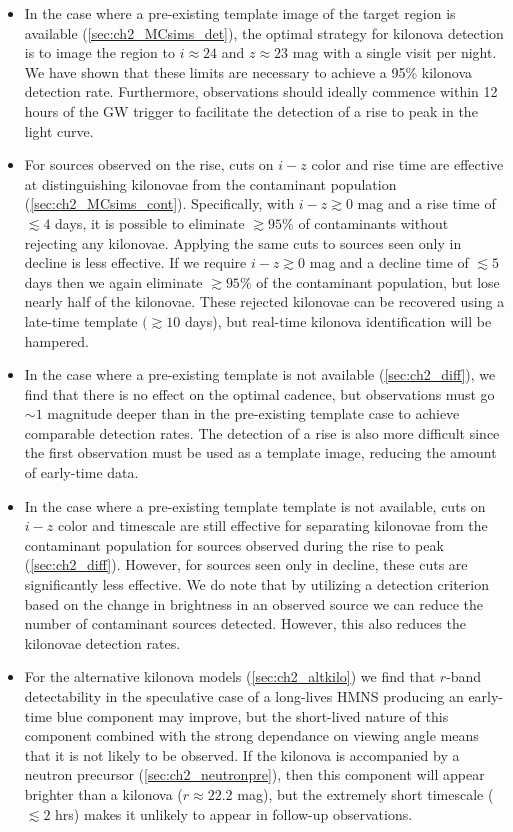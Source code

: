 \begin{itemize}
\item In the case where a pre-existing template image of the target region is available (\cref{sec:ch2_MCsims_det}), the optimal strategy for kilonova detection is to image the region to $i\approx 24$ and $z\approx 23$ mag with a single visit per night. We have shown that these limits are necessary to achieve a 95\% kilonova detection rate. Furthermore, observations should ideally commence within 12 hours of the GW trigger to facilitate the detection of a rise to peak in the light curve.
\item For sources observed on the rise, cuts on $i-z$ color and rise time are effective at distinguishing kilonovae from the contaminant population (\cref{sec:ch2_MCsims_cont}). Specifically, with $i-z\gtrsim0$ mag and a rise time of $\lesssim 4$ days, it is possible to eliminate $\gtrsim95\%$ of contaminants without rejecting any kilonovae. Applying the same cuts to sources seen only in decline is less effective. If we require $i-z\gtrsim0$ mag and a decline time of $\lesssim5$ days then we again eliminate $\gtrsim95\%$ of the contaminant population, but lose nearly half of the kilonovae. These rejected kilonovae can be recovered using a late-time template $(\gtrsim10$ days), but real-time kilonova identification will be hampered.
\clearpage
\item In the case where a pre-existing template is not available (\cref{sec:ch2_diff}), we find that there is no effect on the optimal cadence, but observations must go $\sim1$ magnitude deeper than in the pre-existing template case to achieve comparable detection rates. The detection of a rise is also more difficult since the first observation must be used as a template image, reducing the amount of early-time data.
\item In the case where a pre-existing template template is not available, cuts on $i-z$ color and timescale are still effective for separating kilonovae from the contaminant population for sources observed during the rise to peak (\cref{sec:ch2_diff}). However, for sources seen only in decline, these cuts are significantly less effective. We do note that by utilizing a detection criterion based on the change in brightness in an observed source we can reduce the number of contaminant sources detected. However, this also reduces the kilonovae detection rates.
\item For the alternative kilonova models (\cref{sec:ch2_altkilo}) we find that $r$-band detectability in the speculative case of a long-lives HMNS producing an early-time blue component may improve, but the short-lived nature of this component combined with the strong dependance on viewing angle means that it is not likely to be observed. If the kilonova is accompanied by a neutron precursor (\cref{sec:ch2_neutronpre}), then this component will appear brighter than a kilonova ($r\approx22.2$ mag), but the extremely short timescale ($\lesssim2$ hrs) makes it unlikely to appear in follow-up observations.

\end{itemize}
